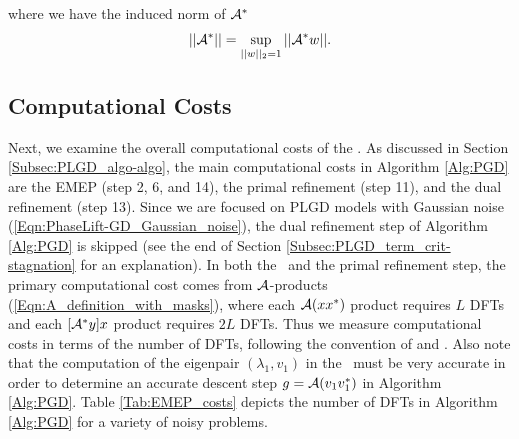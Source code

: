 where we have the induced norm of ${\mathcal A}^*$
\[
||{\mathcal A}^*|| = \sup_{\substack{||w||_2=1}}||{\mathcal A}^*w||.
\]



\subsection{Computational Costs} 	\label{Subsubsec:evol_mats-EMEP_compu_costs}


Next, we examine the overall computational costs of the \emep.
As discussed in Section \ref{Subsec:PLGD_algo-algo}, the main computational costs in Algorithm \ref{Alg:PGD} are the EMEP (step 2, 6, and 14), the primal refinement (step 11), and the dual refinement (step 13).  
Since we are focused on PLGD models with Gaussian noise (\ref{Eqn:PhaseLift-GD_Gaussian_noise}), the dual refinement step of Algorithm \ref{Alg:PGD} is skipped (see the end of Section \ref{Subsec:PLGD_term_crit-stagnation} for an explanation).
In both the \emep \ and the primal refinement step, the primary computational cost comes from ${\mathcal A}$-products (\ref{Eqn:A_definition_with_masks}), where each ${\mathcal A}(xx^*)$ product requires $L$ DFTs and each $[{\mathcal A}^*y]x$ product requires $2L$ DFTs.  
Thus we measure computational costs in terms of the number of DFTs, following the convention of \cite{DBLP:journals/tit/CandesLS15} and \cite{DBLP:journals/siamsc/FriedlanderM16}.
Also note that the computation of the eigenpair $(\lambda_1, v_1)$ in the \emep \ must be very accurate in order to determine an accurate descent step $g = {\mathcal A}(v_1v_1^*)$ in Algorithm \ref{Alg:PGD}.
Table \ref{Tab:EMEP_costs} depicts the number of DFTs in Algorithm \ref{Alg:PGD} for a variety of noisy problems.
